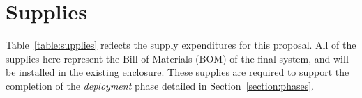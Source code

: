 \documentclass[12pt]{article}
\begin{document}
%
%
%

%
%
\section{Supplies}
\label{section:supplies}
Table~\ref{table:supplies} reflects the supply expenditures for this proposal. All of the supplies here represent the Bill of Materials (BOM) of the final system, and will be installed in the existing enclosure. These supplies are required to support the completion of the \textit{deployment} phase detailed in Section~\ref{section:phases}.\\
\end{document}
